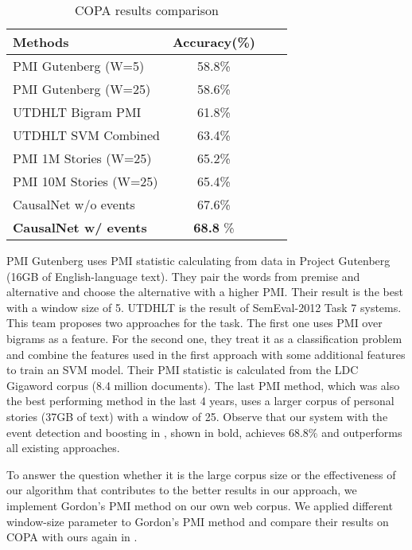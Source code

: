 \begin{table}[th]
\centering
\caption{COPA results comparison}
\label{tab:evaluation}
\begin{tabular}{lccc}
\hline
Methods & Accuracy(\%) \\
\hline
PMI Gutenberg (W=5)\cite{roemmele2011choice}  & 58.8\% \\
PMI Gutenberg (W=25)\cite{roemmele2011choice}  & 58.6\% \\
UTDHLT Bigram PMI\cite{goodwin2012utdhlt} &61.8\% \\
UTDHLT SVM Combined\cite{goodwin2012utdhlt} &63.4\% \\
PMI 1M Stories (W=25)\cite{gordon2011commonsense} & 65.2\% \\
PMI 10M Stories (W=25)\cite{gordon2011commonsense} & 65.4\% \\ \hline
CausalNet w/o events & 67.6\%  \\
{\bf CausalNet w/ events} & {\bf 68.8} \%   \\
\hline
\end{tabular}
\end{table}

PMI Gutenberg uses PMI statistic calculating from data in Project
Gutenberg (16GB of English-language text). They pair the words from
premise and alternative and choose the alternative with a higher
PMI. Their result is the best with a window size of 5. UTDHLT is the
result of SemEval-2012 Task 7 systems. This team proposes two
approaches for the task. The first one uses PMI over bigrams as a
feature. For the second one, they treat it as a classification
problem and combine the features used in the first approach  with
some additional features to train an SVM model. Their PMI statistic
is calculated from the LDC Gigaword corpus (8.4 million documents).
 The last PMI method, which was also the best
performing method in the last 4 years, uses a larger corpus of
personal stories (37GB of text) with a window of 25.
Observe that our system with the event detection and
boosting in , shown in bold, achieves
$68.8\%$ and outperforms all existing approaches.


To answer the question whether it is the large corpus size or the
effectiveness of our algorithm that contributes to the better
results in our approach, we implement Gordon's PMI
method\cite{gordon2012copa} on our own web corpus. We applied
different window-size parameter to Gordon's PMI method and compare
their results on COPA with ours again in .

